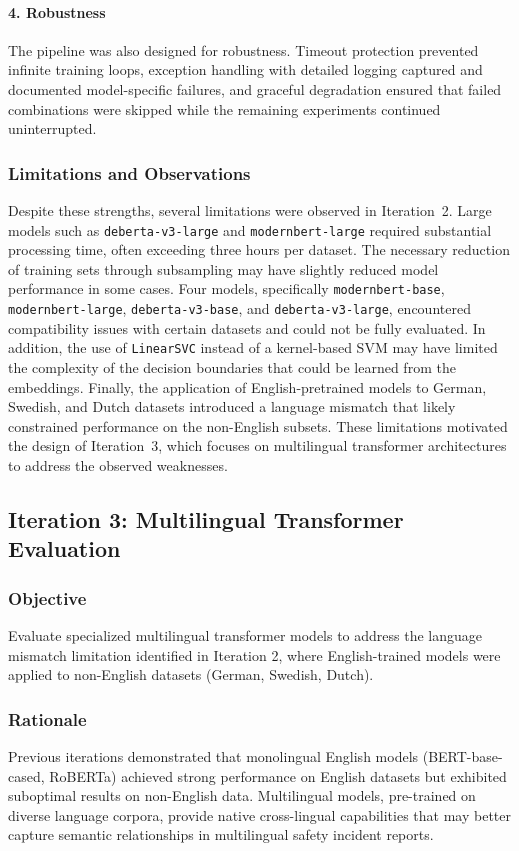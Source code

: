 \documentclass[11pt, titlepage, bibliography=totoc]{scrreprt}
\begin{document}
\paragraph{4. Robustness}
The pipeline was also designed for robustness. Timeout protection prevented infinite training loops, exception handling with detailed logging captured and documented model-specific failures, and graceful degradation ensured that failed combinations were skipped while the remaining experiments continued uninterrupted.

\subsubsection{Limitations and Observations}
Despite these strengths, several limitations were observed in Iteration~2. Large models such as \texttt{deberta-v3-large} and \texttt{modernbert-large} required substantial processing time, often exceeding three hours per dataset. The necessary reduction of training sets through subsampling may have slightly reduced model performance in some cases. Four models, specifically \texttt{modernbert-base}, \texttt{modernbert-large}, \texttt{deberta-v3-base}, and \texttt{deberta-v3-large}, encountered compatibility issues with certain datasets and could not be fully evaluated. In addition, the use of \texttt{LinearSVC} instead of a kernel-based SVM may have limited the complexity of the decision boundaries that could be learned from the embeddings. Finally, the application of English-pretrained models to German, Swedish, and Dutch datasets introduced a language mismatch that likely constrained performance on the non-English subsets. These limitations motivated the design of Iteration~3, which focuses on multilingual transformer architectures to address the observed weaknesses.

\subsection{Iteration 3: Multilingual Transformer Evaluation}

\subsubsection{Objective}
Evaluate specialized multilingual transformer models to address the language mismatch limitation identified in Iteration 2, where English-trained models were applied to non-English datasets (German, Swedish, Dutch).

\subsubsection{Rationale}
Previous iterations demonstrated that monolingual English models (BERT-base-cased, RoBERTa) achieved strong performance on English datasets but exhibited suboptimal results on non-English data. Multilingual models, pre-trained on diverse language corpora, provide native cross-lingual capabilities that may better capture semantic relationships in multilingual safety incident reports.
\end{document}
